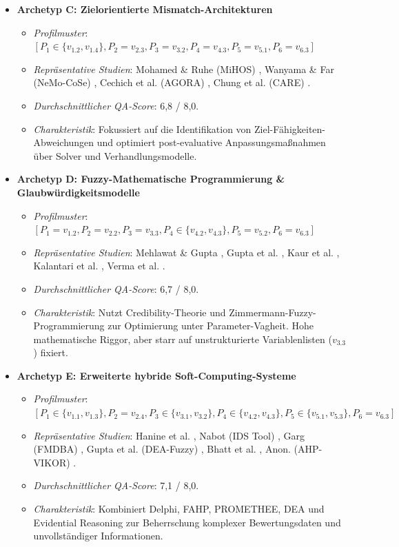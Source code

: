 \begin{itemize}
    \item \textbf{Archetyp C: Zielorientierte Mismatch-Architekturen}
    \begin{itemize}
        \item \textit{Profilmuster}: $[P_1 \in \{v_{1.2}, v_{1.4}\}, P_2=v_{2.3}, P_3=v_{3.2}, P_4=v_{4.3}, P_5=v_{5.1}, P_6=v_{6.3}]$
        \item \textit{Repräsentative Studien}: Mohamed \& Ruhe (MiHOS) \cite{MC9UMXZZ, 9F79VAAB}, Wanyama \& Far (NeMo-CoSe) \cite{CZZ6XQZJ}, Cechich et al. (AGORA) \cite{8XNYS4M9}, Chung et al. (CARE) \cite{6RNULWVY}.
        \item \textit{Durchschnittlicher QA-Score}: 6,8 / 8,0.
        \item \textit{Charakteristik}: Fokussiert auf die Identifikation von Ziel-Fähigkeiten-Abweichungen und optimiert post-evaluative Anpassungsmaßnahmen über Solver und Verhandlungsmodelle.
    \end{itemize}

    \item \textbf{Archetyp D: Fuzzy-Mathematische Programmierung \& Glaubwürdigkeitsmodelle}
    \begin{itemize}
        \item \textit{Profilmuster}: $[P_1=v_{1.2}, P_2=v_{2.2}, P_3=v_{3.3}, P_4 \in \{v_{4.2}, v_{4.3}\}, P_5=v_{5.2}, P_6=v_{6.3}]$
        \item \textit{Repräsentative Studien}: Mehlawat \& Gupta \cite{B7ZTQCZZ, JX4RDRDU}, Gupta et al. \cite{6YJHIVHG}, Kaur et al. \cite{P9SATBH5}, Kalantari et al. \cite{UFCEV52H}, Verma et al. \cite{8KF4HAZS}.
        \item \textit{Durchschnittlicher QA-Score}: 6,7 / 8,0.
        \item \textit{Charakteristik}: Nutzt Credibility-Theorie und Zimmermann-Fuzzy-Programmierung zur Optimierung unter Parameter-Vagheit. Hohe mathematische Riggor, aber starr auf unstrukturierte Variablenlisten ($v_{3.3}$) fixiert.
    \end{itemize}

    \item \textbf{Archetyp E: Erweiterte hybride Soft-Computing-Systeme}
    \begin{itemize}
        \item \textit{Profilmuster}: $[P_1 \in \{v_{1.1}, v_{1.3}\}, P_2=v_{2.4}, P_3 \in \{v_{3.1}, v_{3.2}\}, P_4 \in \{v_{4.2}, v_{4.3}\}, P_5 \in \{v_{5.1}, v_{5.3}\}, P_6=v_{6.3}]$
        \item \textit{Repräsentative Studien}: Hanine et al. \cite{NZJEEPAC}, Nabot (IDS Tool) \cite{LNQHES84}, Garg (FMDBA) \cite{FVINCQ89, 9BLXY3EP}, Gupta et al. (DEA-Fuzzy) \cite{YVWGHAWQ}, Bhatt et al. \cite{5BBYQCJB}, Anon. (AHP-VIKOR) \cite{QNWK8SAP}.
        \item \textit{Durchschnittlicher QA-Score}: 7,1 / 8,0.
        \item \textit{Charakteristik}: Kombiniert Delphi, FAHP, PROMETHEE, DEA und Evidential Reasoning zur Beherrschung komplexer Bewertungsdaten und unvollständiger Informationen.
    \end{itemize}


\end{itemize}
